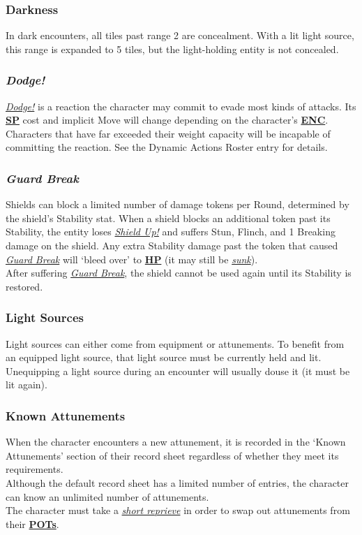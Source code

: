 \documentclass[12pt]{article}
\newcommand{\refto}[1]{\hyperlink{#1}{\textbf{#1}}}
\newcommand{\reftoit}[1]{\hyperlink{#1}{\emph{#1}}}
\begin{document}
\begin{multicols*}{2}
\subsubsection{Darkness}
In dark encounters, all tiles past range 2 are concealment. With a lit light source, this range is expanded to 5 tiles, but the light-holding entity is not concealed.

\subsubsection{\emph{Dodge!}}
\hypertarget{Dodge!}{}
\reftoit{Dodge!} is a reaction the character may commit to evade most kinds of attacks. Its \refto{SP} cost and implicit Move will change depending on the character’s \refto{ENC}. Characters that have far exceeded their weight capacity will be incapable of committing the reaction. See the Dynamic Actions Roster entry for details.

\subsubsection{\emph{Guard Break}}
\hypertarget{Guard Break}{}
Shields can block a limited number of damage tokens per Round, determined by the shield’s Stability stat. When a shield blocks an additional token past its Stability, the entity loses \reftoit{Shield Up!} and suffers Stun, Flinch, and 1 Breaking damage on the shield. Any extra Stability damage past the token that caused \reftoit{Guard Break} will ‘bleed over’ to \refto{HP} (it may still be \reftoit{sunk}).\\
After suffering \reftoit{Guard Break}, the shield cannot be used again until its Stability is restored.

\subsubsection{Light Sources}
Light sources can either come from equipment or attunements. To benefit from an equipped light source, that light source must be currently held and lit.\\
Unequipping a light source during an encounter will usually douse it (it must be lit again).

\subsubsection{Known Attunements}
When the character encounters a new attunement, it is recorded in the ‘Known Attunements’ section of their record sheet regardless of whether they meet its requirements.\\
Although the default record sheet has a limited number of entries, the character can know an unlimited number of attunements.\\
The character must take a \reftoit{short reprieve} in order to swap out attunements from their \refto{POTs}.


\end{multicols*}
\end{document}
